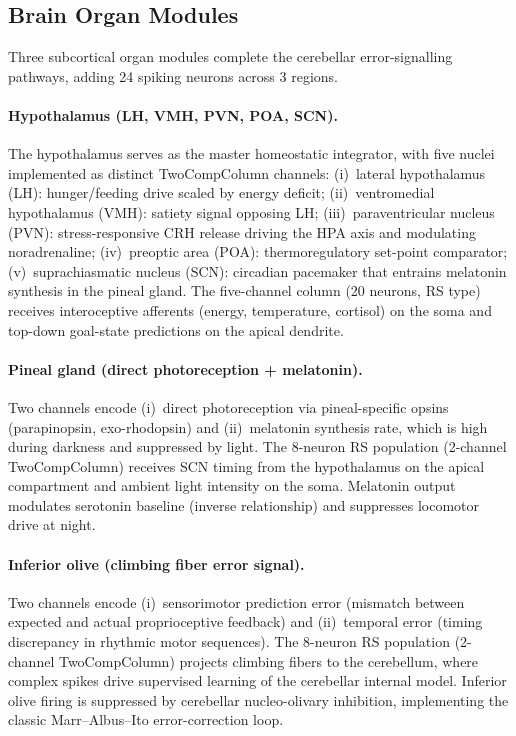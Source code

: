 \documentclass[11pt,a4paper]{article}
\begin{document}
\subsection{Brain Organ Modules}

Three subcortical organ modules complete the cerebellar
error-signalling pathways, adding 24 spiking neurons across 3 regions.

\paragraph{Hypothalamus (LH, VMH, PVN, POA, SCN).}
The hypothalamus serves as the master homeostatic integrator, with five
nuclei implemented as distinct TwoCompColumn channels:
(i)~lateral hypothalamus (LH): hunger/feeding drive scaled by energy deficit;
(ii)~ventromedial hypothalamus (VMH): satiety signal opposing LH;
(iii)~paraventricular nucleus (PVN): stress-responsive CRH release driving
the HPA axis and modulating noradrenaline;
(iv)~preoptic area (POA): thermoregulatory set-point comparator;
(v)~suprachiasmatic nucleus (SCN): circadian pacemaker that entrains
melatonin synthesis in the pineal gland.
The five-channel column (20 neurons, RS type) receives interoceptive
afferents (energy, temperature, cortisol) on the soma and top-down
goal-state predictions on the apical dendrite.

\paragraph{Pineal gland (direct photoreception + melatonin).}
Two channels encode (i)~direct photoreception via pineal-specific
opsins (parapinopsin, exo-rhodopsin) and (ii)~melatonin synthesis
rate, which is high during darkness and suppressed by light.
The 8-neuron RS population (2-channel TwoCompColumn) receives SCN
timing from the hypothalamus on the apical compartment and ambient
light intensity on the soma.  Melatonin output modulates serotonin
baseline (inverse relationship) and suppresses locomotor drive at night.

\paragraph{Inferior olive (climbing fiber error signal).}
Two channels encode (i)~sensorimotor prediction error (mismatch between
expected and actual proprioceptive feedback) and (ii)~temporal error
(timing discrepancy in rhythmic motor sequences).  The 8-neuron RS
population (2-channel TwoCompColumn) projects climbing fibers to the
cerebellum, where complex spikes drive supervised learning of the
cerebellar internal model.  Inferior olive firing is suppressed by
cerebellar nucleo-olivary inhibition, implementing the classic
Marr--Albus--Ito error-correction loop.
\end{document}
